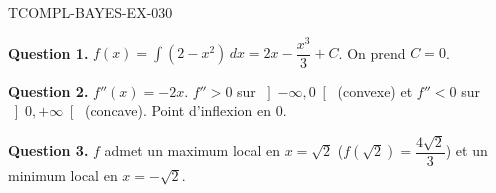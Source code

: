 \begin{corrige}{TCOMPL-BAYES-EX-030}

\textbf{Question 1.} $f(x) = \int (2 - x^2)\,dx = 2x - \dfrac{x^3}{3} + C$. On prend $C = 0$.


\textbf{Question 2.} $f''(x) = -2x$. $f'' > 0$ sur $\left]-\infty, 0\right[$ (convexe) et $f'' < 0$ sur $\left]0, +\infty\right[$ (concave). Point d'inflexion en $0$.

\textbf{Question 3.} $f$ admet un maximum local en $x = \sqrt{2}$ ($f(\sqrt{2}) = \dfrac{4\sqrt{2}}{3}$) et un minimum local en $x = -\sqrt{2}$.

\end{corrige}
